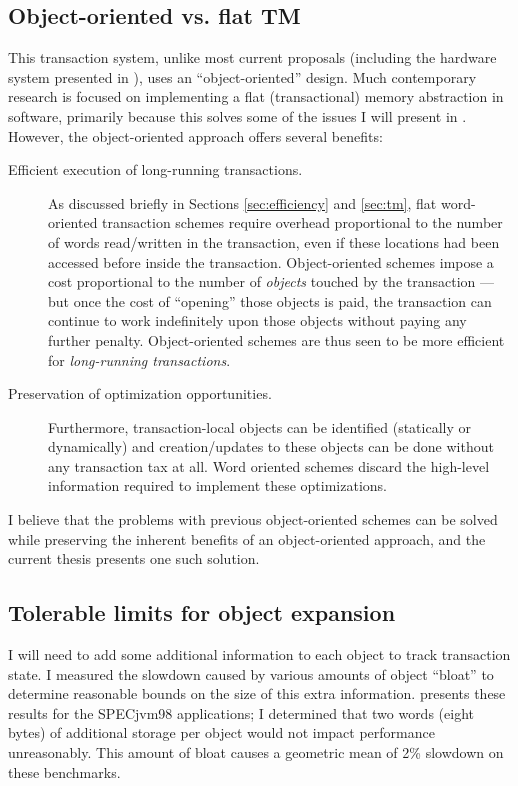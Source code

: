 \subsection{Object-oriented vs. flat TM}
This transaction system, unlike most current proposals
\cite{HarrisFr03,HerlihyMo93} (including the
hardware system presented in ), uses an
``object-oriented'' design.  Much contemporary research is focused on
implementing a flat (transactional) memory abstraction in software,
primarily because this solves some of the issues I will present in
.  However, the object-oriented approach offers
several benefits:
\begin{description}
\item[Efficient execution of long-running transactions.]  As discussed
  briefly in Sections \ref{sec:efficiency} and \ref{sec:tm}, flat
  word-oriented transaction schemes require overhead proportional to
  the number of words read/written in the transaction, even if these
  locations had been accessed before inside the transaction. Object-oriented
  schemes impose a cost proportional to the number of \emph{objects}
  touched by the transaction --- but once the cost of ``opening'' those
  objects is paid, the transaction can continue to work indefinitely
  upon those objects without paying any further penalty.
  Object-oriented schemes are thus seen to be more efficient for
  \emph{long-running transactions}.
\item[Preservation of optimization opportunities.]  Furthermore,
  transaction-local objects can be identified (statically or
  dynamically) and creation/updates to these objects can be done
  without any transaction tax at all.  Word oriented schemes discard
  the high-level information required to implement these optimizations.
\end{description}
I believe that the problems with previous object-oriented schemes can
be solved while preserving the inherent benefits of an object-oriented
approach, and the current thesis presents one such solution.

\subsection{Tolerable limits for object expansion}
I will need to add some additional information to each object to
track transaction state.  I measured the slowdown caused by various
amounts of object ``bloat'' to determine reasonable bounds on the
size of this extra information.   presents these
results for the SPECjvm98 applications; I determined that two words
(eight bytes) of additional storage per object would not impact
performance unreasonably.  This amount of bloat causes a geometric
mean of 2\% slowdown on these benchmarks.


